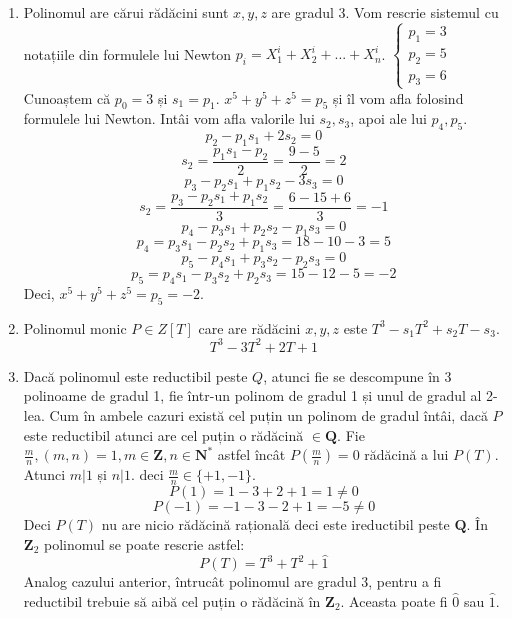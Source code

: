 \documentclass{article}
\begin{document}
\begin{enumerate}
    \item Polinomul are cărui rădăcini sunt $x, y, z$ are gradul 3. 
    Vom rescrie sistemul cu notațiile din formulele lui Newton $p_i = X_1^i + X_2^i + ... + X_n^i$. \newline
    $\begin{cases} 
    p_1 = 3 \\ 
    p_2 = 5 \\ 
    p_3 = 6
    \end{cases}$ \newline
    Cunoaștem că $p_0 = 3$ și $s_1 = p_1$. $x^5 + y^5 + z^5 = p_5$ și îl vom afla folosind formulele lui Newton. Intâi vom afla valorile lui $s_2, s_3$, apoi ale lui $p_4, p_5$.
    \[ p_2 - p_1 s_1 + 2s_2 = 0 \]
    \[ s_2 = \frac{p_1 s_1 - p_2}{2} = \frac{9 - 5}{2} = 2\]
    \[ p_3 - p_2 s_1 + p_1 s_2 - 3 s_3= 0 \]
     \[ s_2 = \frac{p_3 - p_2 s_1 + p_1 s_2}{3} = \frac{6 - 15 + 6}{3} = -1\]
     \[ p_4 - p_3 s_1 + p_2 s_2 - p_1 s_3 = 0\]
     \[ p_4 = p_3 s_1 - p_2 s_2 + p_1 s_3 = 18 - 10 - 3 = 5\]
     \[ p_5 - p_4 s_1 + p_3 s_2 - p_2 s_3 = 0\]
     \[ p_5 = p_4 s_1 - p_3 s_2 + p_2 s_3 = 15 - 12 - 5 = -2\]
     Deci, $x^5 + y^5 + z^5 = p_5 = -2$.
     \item Polinomul monic $P \in Z[T]$ care are rădăcini $x, y, z$ este $T^3 - s_1 T^2 + s_2 T - s_3$.
     \[ T^3 - 3T^2 + 2T + 1\]
      \item Dacă polinomul este reductibil peste $Q$, atunci fie se descompune în 3 polinoame de gradul 1, fie într-un polinom de gradul 1 și unul de gradul al 2-lea. Cum în ambele cazuri există cel puțin un polinom de gradul întâi, dacă $P$ este reductibil atunci are cel puțin o rădăcină $\in \mathbf{Q}$. Fie $\frac{m}{n}, (m, n) = 1, m \in \mathbf{Z}, n \in \mathbf{N}^*$ astfel încât $P(\frac{m}{n}) = 0$ rădăcină a lui $P(T)$. \newline
      Atunci $m|1$ și $n|1$. deci $\frac{m}{n} \in \{+1, -1\}$. \newline
      \[ P(1) = 1 - 3 + 2 + 1 = 1 \neq 0\]
      \[ P(- 1) = -1 - 3 - 2 + 1 = -5 \neq 0\]
      Deci $P(T)$ nu are nicio rădăcină rațională deci este ireductibil peste $\mathbf{Q}$. 
      În $\mathbf{Z}_2$ polinomul se poate rescrie astfel: 
      \[ P(T) = T^3 + T^2 + \widehat{1}\]
      Analog cazului anterior, întrucât polinomul are gradul 3, pentru a fi reductibil trebuie să aibă cel puțin o rădăcină în $\mathbf{Z}_2$. Aceasta poate fi $\widehat{0}$ sau $\widehat{1}$. \newline

\end{enumerate}
\end{document}
